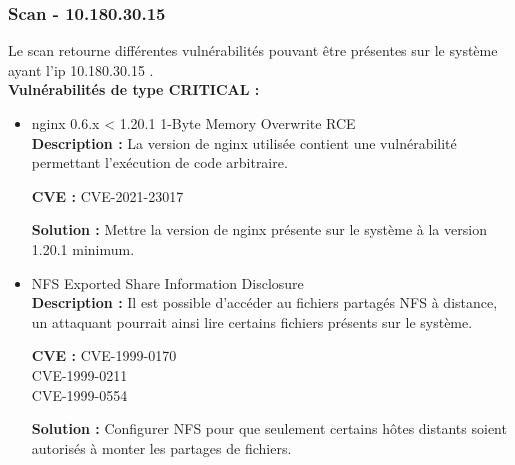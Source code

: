 \documentclass[french,paper=a4,oneside,captions=tableheading]{article}
\begin{document}
\subsubsection{Scan - 10.180.30.15}

Le scan retourne différentes vulnérabilités pouvant être présentes sur le système ayant l'ip 10.180.30.15 .\\
\textbf{Vulnérabilités de type CRITICAL :}\\

\begin{itemize}
    \item nginx 0.6.x < 1.20.1 1-Byte Memory Overwrite RCE \\
\textbf{Description :}
La version de nginx utilisée contient une vulnérabilité permettant l'exécution de code arbitraire.

\textbf{CVE :}
CVE-2021-23017

\textbf{Solution :}
Mettre la version de nginx présente sur le système à la version 1.20.1 minimum.\\


    \item NFS Exported Share Information Disclosure \\
\textbf{Description :}
Il est possible d'accéder au fichiers partagés NFS à distance, un attaquant pourrait ainsi lire certains fichiers présents sur le système.

\textbf{CVE :}
CVE-1999-0170\\
CVE-1999-0211\\
CVE-1999-0554


\textbf{Solution :}
Configurer NFS pour que seulement certains hôtes distants soient autorisés à monter les partages de fichiers.\\

\end{itemize}
\end{document}
